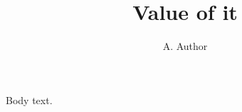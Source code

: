 \documentclass{article}
\title{Value \val{1+1.5} of it}
\author{A. Author}
\begin{document}
\makeatletter
{\Large\bf \@title\par}
\makeatother
Body text.
\end{document}
